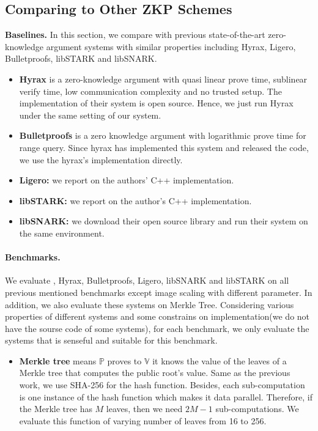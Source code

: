 \subsection{Comparing to Other ZKP Schemes}\label{subsec:expZKP}
\textbf{Baselines.} In this section, we compare \name{} with previous state-of-the-art zero-knowledge argument systems with similar properties including Hyrax\cite{hyrax}, Ligero\cite{ligero}, Bulletproofs\cite{bulletproofs}, libSTARK\cite{libstark} and libSNARK\cite{libsnark}.
\begin{itemize}
\item
\textbf{Hyrax} is a zero-knowledge argument with quasi linear prove time, sublinear verify time, low communication complexity and no trusted setup. The implementation of their system is open source. Hence, we just run Hyrax under the same setting of our system.
\item
\textbf{Bulletproofs} is a zero knowledge argument with logarithmic prove time for range query. Since hyrax has implemented this system and released the code, we use the hyrax's implementation directly.
\item
\textbf{Ligero:} we report on the authors' C++ implementation.
\item
\textbf{libSTARK:} we report on the author's C++ implementation.
\item
\textbf{libSNARK:} we download their open source library and run their system on the same environment.
\end{itemize}
\paragraph{Benchmarks.} We evaluate \name{}, Hyrax, Bulletproofs, Ligero, libSNARK and libSTARK on all previous mentioned benchmarks except image scaling with different parameter. In addition, we also evaluate these systems on Merkle Tree\cite{merkletree}. Considering various properties of different systems and some constrains on implementation(\ie we do not have the sourse code of some systems), for each benchmark, we only evaluate the systems that is senseful and suitable for this benchmark.
\begin{itemize}
	\item
	\textbf{Merkle tree} means $\mathbb{P}$ proves to $\mathbb{V}$ it knows the value of the leaves of a Merkle tree\cite{merkletree} that computes the public root's value\cite{blum1994checking}. Same as the previous work, we use SHA-256 for the hash function. Besides, each sub-computation is one instance of the hash function which makes it data parallel. Therefore, if the Merkle tree has $M$ leaves, then we need $2M - 1$ sub-computations. We evaluate this function of varying number of leaves from 16 to 256.
\end{itemize}
